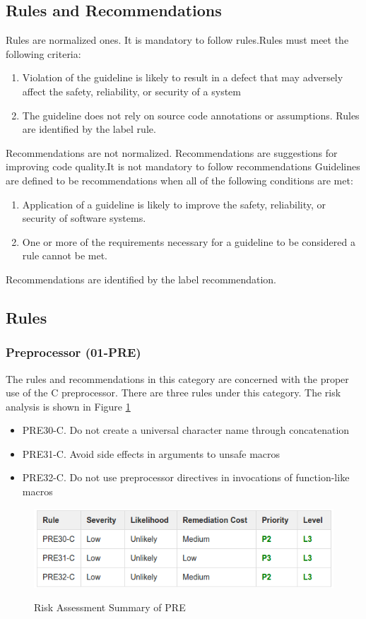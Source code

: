 \subsection{Rules and Recommendations}
Rules are normalized ones. It is mandatory to follow rules.Rules must meet the following criteria:
	\begin{enumerate}
	 
		\item Violation of the guideline is likely to result in a defect that may adversely affect the safety, reliability, or security of a system
		\item The guideline does not rely on source code annotations or assumptions.
	Rules are identified by the label rule.
\end{enumerate}
		Recommendations are not normalized. Recommendations are suggestions for improving code quality.It is not mandatory to follow recommendations Guidelines are defined to be recommendations when all of the following conditions are met:
	\begin{enumerate}
	  
		\item Application of a guideline is likely to improve the safety, reliability, or security of software systems.
	\item One or more of the requirements necessary for a guideline to be considered a rule cannot be met.
\end{enumerate}	
	Recommendations are identified by the label recommendation.

 

\subsection{Rules}

\subsubsection{Preprocessor (01-PRE)}
 The rules and recommendations in this category are concerned with the proper use of the C preprocessor. There are three rules under this category. The risk analysis is shown in Figure \ref{fig:2}\cite{cert-c}
\begin{itemize}
	\item PRE30-C. Do not create a universal character name through concatenation

\item PRE31-C. Avoid side effects in arguments to unsafe macros

\item PRE32-C. Do not use preprocessor directives in invocations of function-like macros
\end{itemize}
\begin{figure}[H]
	
	
	\centering
	\includegraphics[width=.6\linewidth]{Figures/pre}
	\caption{Risk Assessment Summary of PRE }
	\label{fig:2}\cite{cert-c}
	
\end{figure}
